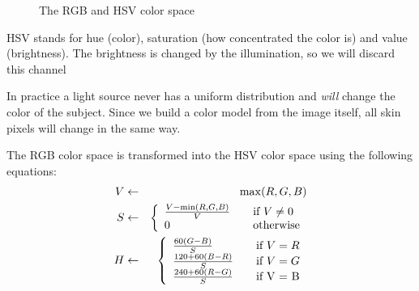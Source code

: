 \begin{figure}[htbp]
  \centering
{}
\hspace{0.01\linewidth}
  \caption{The RGB and HSV color space}
  \label{fig:hsvchannels}
\end{figure}

HSV stands for hue (color), saturation (how concentrated the color is) and value (brightness). The brightness is changed by the illumination, so we will discard this channel

In practice a light source never has a uniform distribution and \emph{will} change the color of the subject. Since we build a color model from the image itself, all skin pixels will change in the same way. 

The RGB color space is transformed into the HSV color space using the following equations:
\begin{eqnarray*}
  V & \leftarrow & \max(R,G,B) \\
  S & \leftarrow & \left\{
  \begin{array}{l l}
    \frac{V-\min(R, G, B)}{V} & \quad \text{if $V \neq 0$} \\
    0 						  & \quad \text{otherwise} \\
  \end{array} \right.\\
  H & \leftarrow & \left\{
  \begin{array}{l l}
    \frac{60(G - B)}{S}     & \quad \text{if $V = R$} \\
    \frac{120 + 60(B-R)}{S} & \quad \text{if $V = G$} \\
    \frac{240 + 60(R-G)}{S} & \quad \text{if V = B} \\
  \end{array} \right.\\
\end{eqnarray*}

